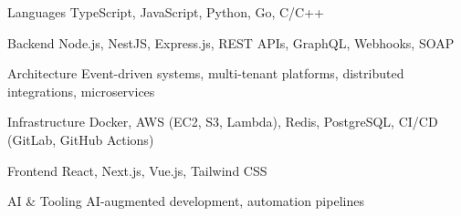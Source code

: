 

\begin{cvskills}

  \cvskill
    {Languages} %
    {TypeScript, JavaScript, Python, Go, C/C++}

  \cvskill
    {Backend} %
    {Node.js, NestJS, Express.js, REST APIs, GraphQL, Webhooks, SOAP}

  \cvskill
    {Architecture} %
    {Event-driven systems, multi-tenant platforms, distributed integrations, microservices}

  \cvskill
    {Infrastructure} %
    {Docker, AWS (EC2, S3, Lambda), Redis, PostgreSQL, CI/CD (GitLab, GitHub Actions)}

  \cvskill
    {Frontend} %
    {React, Next.js, Vue.js, Tailwind CSS}

  \cvskill
    {AI \& Tooling} %
    {AI-augmented development, automation pipelines}

\end{cvskills}
